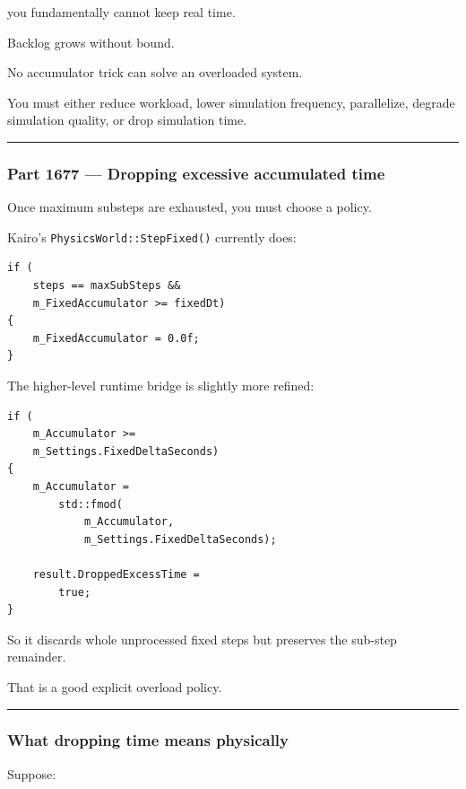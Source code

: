 you fundamentally cannot keep real time.

Backlog grows without bound.

No accumulator trick can solve an overloaded system.

You must either reduce workload, lower simulation frequency, parallelize, degrade simulation quality, or drop simulation time.

\begin{center}\rule{0.5\linewidth}{0.5pt}\end{center}

\subsubsection{Part 1677 --- Dropping excessive accumulated time}\label{part-1677-dropping-excessive-accumulated-time}

Once maximum substeps are exhausted, you must choose a policy.

Kairo's \texttt{PhysicsWorld::StepFixed()} currently does:

\begin{verbatim}
if (
    steps == maxSubSteps &&
    m_FixedAccumulator >= fixedDt)
{
    m_FixedAccumulator = 0.0f;
}
\end{verbatim}

The higher-level runtime bridge is slightly more refined:

\begin{verbatim}
if (
    m_Accumulator >=
    m_Settings.FixedDeltaSeconds)
{
    m_Accumulator =
        std::fmod(
            m_Accumulator,
            m_Settings.FixedDeltaSeconds);

    result.DroppedExcessTime =
        true;
}
\end{verbatim}

So it discards whole unprocessed fixed steps but preserves the sub-step remainder.

That is a good explicit overload policy.

\begin{center}\rule{0.5\linewidth}{0.5pt}\end{center}

\subsubsection{What dropping time means physically}\label{what-dropping-time-means-physically}

Suppose:

